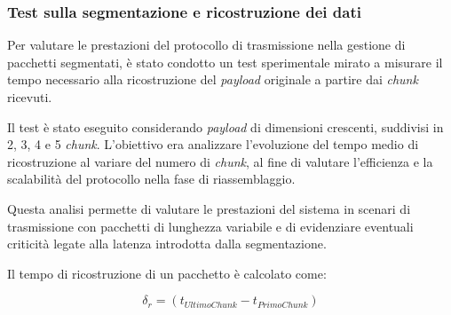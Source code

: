 \documentclass[12pt,a4paper,twoside]{book}
\begin{document}
\subsubsection{Test sulla segmentazione e ricostruzione dei dati}
\begin{table}[H]
    \centering
    \caption{Condizioni del test di segmentazione e ricostruzione dei dati.}
    \label{tab:T2-conditions}
\end{table}

Per valutare le prestazioni del protocollo di trasmissione nella gestione di pacchetti segmentati,
è stato condotto un test sperimentale mirato a misurare il tempo necessario alla ricostruzione
del \emph{payload} originale a partire dai \emph{chunk} ricevuti.

Il test è stato eseguito considerando \emph{payload} di dimensioni crescenti, suddivisi in 2, 3, 4 e 5
\emph{chunk}.
L’obiettivo era analizzare l’evoluzione del tempo medio di ricostruzione al variare del numero di
\emph{chunk}, al fine di valutare l’efficienza e la scalabilità del protocollo nella fase di riassemblaggio.

Questa analisi permette di valutare le prestazioni del sistema in scenari di trasmissione con pacchetti
di lunghezza variabile e di evidenziare eventuali criticità legate alla latenza introdotta dalla segmentazione.

Il tempo di ricostruzione di un pacchetto è calcolato come:

\begin{equation}
    \delta_{r} = (t_{UltimoChunk} - t_{PrimoChunk})
    \label{formula:reconstruction-time}
\end{equation}
\end{document}
